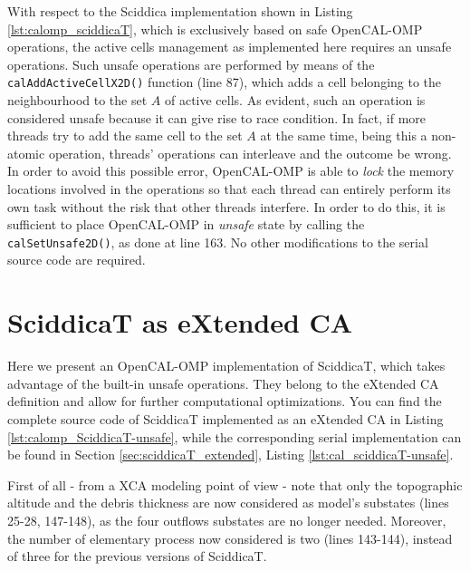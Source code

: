 

With respect to the Sciddica implementation shown in Listing
\ref{lst:calomp_sciddicaT}, which is exclusively based on safe
OpenCAL-OMP operations, the active cells management as implemented
here requires an unsafe operations. Such unsafe operations are
performed by means of the \verb'calAddActiveCellX2D()' function (line
87), which adds a cell belonging to the neighbourhood to the set $A$
of active cells. As evident, such an operation is considered unsafe
because it can give rise to race condition. In fact, if more threads
try to add the same cell to the set $A$ at the same time, being this a
non-atomic operation, threads' operations can interleave and the
outcome be wrong. In order to avoid this possible error, OpenCAL-OMP
is able to \emph{lock} the memory locations involved in the operations
so that each thread can entirely perform its own task without the risk
that other threads interfere. In order to do this, it is sufficient to
place OpenCAL-OMP in \emph{unsafe} state by calling the
\verb'calSetUnsafe2D()', as done at line 163. No other modifications
to the serial source code are required.

\section{SciddicaT as eXtended CA}
Here we present an OpenCAL-OMP implementation of SciddicaT, which takes
advantage of the built-in unsafe operations. They belong to the
eXtended CA definition and allow for further computational
optimizations. You can find the complete source code of SciddicaT
implemented as an eXtended CA in Listing
\ref{lst:calomp_SciddicaT-unsafe}, while the corresponding serial
implementation can be found in Section \ref{sec:sciddicaT_extended},
Listing \ref{lst:cal_sciddicaT-unsafe}.



First of all - from a XCA modeling point of view - note that only the
topographic altitude and the debris thickness are now considered as
model's substates (lines 25-28, 147-148), as the four outflows
substates are no longer needed. Moreover, the number of elementary
process now considered is two (lines 143-144), instead of three for
the previous versions of SciddicaT.

